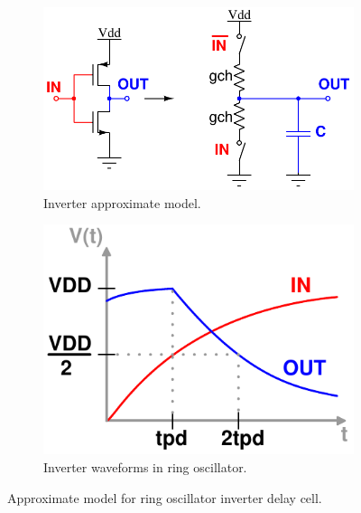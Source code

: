 \documentclass[10pt,a4paper]{article}
\begin{document}
	\begin{figure}[htb!]
        \centering
        \begin{subfigure}{.5\textwidth}
            \centering
            \includegraphics[width=\linewidth]{figs/inv_rc_model.pdf}
            \caption{Inverter approximate model.}
            \label{fig:rosc_3stg_cir}
        \end{subfigure}%
        \begin{subfigure}{.5\textwidth}
            \centering
            \includegraphics[width=0.8\linewidth]{figs/inv_waves2.pdf}
            \caption{Inverter waveforms in ring oscillator.}
            \label{fig:rosc_3stg_wave}
        \end{subfigure}
        \caption{Approximate model for ring oscillator inverter delay cell.}
        \label{fig:rosc_3stg}
    \end{figure}
\end{document}
